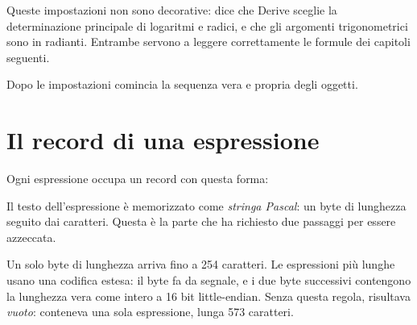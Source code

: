 \noindent
Queste impostazioni non sono decorative:  dice che
Derive sceglie la determinazione principale di logaritmi e radici, e
 che gli argomenti trigonometrici sono in radianti.
Entrambe servono a leggere correttamente le formule dei capitoli seguenti.

Dopo le impostazioni comincia la sequenza vera e propria degli oggetti.

\section{Il record di una espressione}

Ogni espressione occupa un record con questa forma:

\begin{center}
\end{center}

\noindent
Il testo dell'espressione \`e memorizzato come \emph{stringa Pascal}: un
byte di lunghezza seguito dai caratteri. Questa \`e la parte che ha
richiesto due passaggi per essere azzeccata.

\begin{osservazione}
Un solo byte di lunghezza arriva fino a 254 caratteri. Le espressioni pi\`u
lunghe usano una codifica estesa: il byte  fa da segnale, e i due
byte successivi contengono la lunghezza vera come intero a 16 bit
little-endian. Senza questa regola,  risultava
\emph{vuoto}: conteneva una sola espressione, lunga 573 caratteri.
\end{osservazione}

